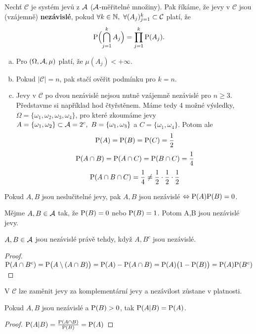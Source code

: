 \begin{define}
	Nechť $\mathcal{C}$ je systém jevů z $\mathcal{A} $ ($\mathcal{A} $-měřitelné množiny). Pak říkáme, že jevy v $\mathcal{C}$ jsou (vzájemně) \textbf{nezávislé}, pokud $\forall k \in \mathbb{N},~\forall (A_j)_{j=1}^k \subset \mathcal{C}$ platí, že
	\[
	 \mathrm{P}\Bigl( \bigcap\limits_{j=1}^{k} A_j \Bigr) = \prod\limits_{j=1}^{k}\mathrm{P}(A_j).
	\]
\end{define}
\begin{remark}
	\begin{enumerate}[a)]
		\item Pro $(\Omega,\mathcal{A},\mu)$ platí, že $\mu(A_j)<+\infty$.
		\item Pokud $|\mathcal{C}|=n$, pak stačí ověřit podmínku pro $k=n$.
		\item Jevy v $\mathcal{C}$ po dvou nezávislé nejsou nutně vzájemně nezávislé pro $n\geq 3$. Představme si například hod čtyřstěnem. Máme tedy 4 možné výsledky, $\Omega=\{\omega_1,\omega_2,\omega_3,\omega_4\}$, pro které zkoumáme jevy $A=\{\omega_1,\omega_2\} \subset \mathcal{A} =2^c,~B=\{\omega_1,\omega_3\}$ a $C=\{\omega_1,\omega_4\}$. Potom ale
		 $$\mathrm{P}(A)=\mathrm{P}(B)=\mathrm{P}(C)=\frac{1}{2}$$
		$$\mathrm{P}(A \cap B)=\mathrm{P}(A \cap C)=\mathrm{P}(B \cap C)=\frac{1}{4}$$
		$$\mathrm{P}(A \cap B \cap C)= \frac{1}{4} \neq \frac{1}{2} \cdot \frac{1}{2} \cdot \frac{1}{2} $$
	\end{enumerate}
\end{remark}
\begin{theorem}
Pokud $A,B$ jsou neslučitelné jevy, pak $A,B$ jsou nezávislé $\Leftrightarrow \mathrm{P}(A)\mathrm{P}(B)=0$.
\end{theorem}
\begin{theorem}
Mějme	$A, B \in \mathcal{A} $ tak, že $\mathrm{P}(B)=0$ nebo $\mathrm{P}(B)=1$. Potom A,B jsou nezávislé jevy.
\end{theorem}
\begin{theorem}
	$A,B \in \mathcal{A} $ jsou nezávislé právě tehdy, když $A,B^c$ jsou nezávislé.
	\begin{proof}
		$\mathrm{P}(A \cap B^c) = \mathrm{P}\bigl(A \setminus (A \cap B)\bigr)=\mathrm{P}(A)-\mathrm{P}(A\cap B)= \mathrm{P}(A)\bigl(1-\mathrm{P}(B)\bigr)=\mathrm{P}(A)\mathrm{P}(B^c)$
	\end{proof}
\end{theorem}
\begin{dusl}
	V $\mathcal{C}$ lze zaměnit jevy za komplementární jevy a nezávilost zůstane v platnosti.
\end{dusl}
\begin{theorem}
Pokud $A,B$ jsou nezávislé a $\mathrm{P}(B)>0$, tak $\mathrm{P}(A|B)=\mathrm{P}(A)$.
\begin{proof}
		$\mathrm{P}(A|B)=\frac{\mathrm{P}(A\cap B)}{\mathrm{P}(B)}=\mathrm{P}(A)$
	\end{proof}
\end{theorem}
